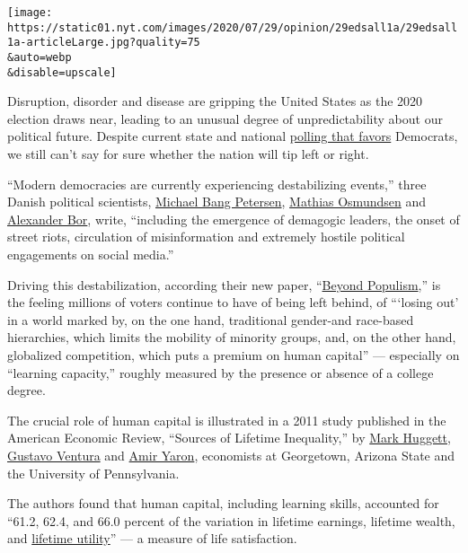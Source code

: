 \texttt{[image: https://static01.nyt.com/images/2020/07/29/opinion/29edsall1a/29edsall1a-articleLarge.jpg?quality=75\\\&auto=webp\\\&disable=upscale]}

Disruption, disorder and disease are gripping the United States as the
2020 election draws near, leading to an unusual degree of
unpredictability about our political future. Despite current state and
national \href{https://projects.fivethirtyeight.com/polls/}{polling that
favors} Democrats, we still can't say for sure whether the nation will
tip left or right.

``Modern democracies are currently experiencing destabilizing events,''
three Danish political scientists,
\href{https://pure.au.dk/portal/en/persons/michael-bang-petersen(7998cc16-75d5-4065-8b6e-395d73e22151).html}{Michael
Bang Petersen},
\href{https://pure.au.dk/portal/en/persons/mathias-osmundsen(a453964f-daa7-4f40-94d0-fde773a485d4).html}{Mathias
Osmundsen} and
\href{https://pure.au.dk/portal/en/persons/alexander-bor(df35f529-baf4-4bbf-916e-9dac13baf052).html}{Alexander
Bor}, write, ``including the emergence of demagogic leaders, the onset
of street riots, circulation of misinformation and extremely hostile
political engagements on social media.''

Driving this destabilization, according their new paper,
``\href{https://psyarxiv.com/puqzs}{Beyond Populism},'' is the feeling
millions of voters continue to have of being left behind, of ```losing
out' in a world marked by, on the one hand, traditional gender-and
race-based hierarchies, which limits the mobility of minority groups,
and, on the other hand, globalized competition, which puts a premium on
human capital'' --- especially on ``learning capacity,'' roughly
measured by the presence or absence of a college degree.

The crucial role of human capital is illustrated in a 2011 study
published in the American Economic Review, ``Sources of Lifetime
Inequality,'' by
\href{https://sites.google.com/georgetown.edu/mark-huggett/home}{Mark
Huggett}, \href{http://www.gustavoventura.com/index.html}{Gustavo
Ventura} and \href{https://fnce.wharton.upenn.edu/profile/yarona/}{Amir
Yaron}, economists at Georgetown, Arizona State and the University of
Pennsylvania.

The authors found that human capital, including learning skills,
accounted for ``61.2, 62.4, and 66.0 percent of the variation in
lifetime earnings, lifetime wealth, and
\href{https://www.economicshelp.org/blog/26552/concepts/measuring-utility/}{lifetime
utility}'' --- a measure of life satisfaction.


